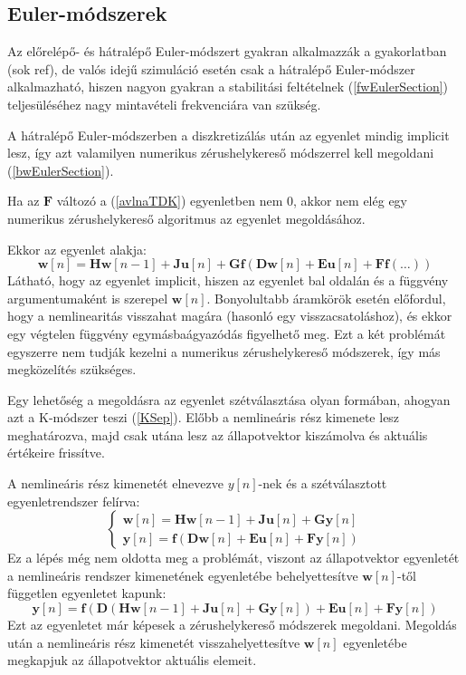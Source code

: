 \subsection{Euler-módszerek}

Az előrelépő- és hátralépő Euler-módszert gyakran alkalmazzák a gyakorlatban (sok ref), de valós idejű szimuláció esetén csak a hátralépő Euler-módszer alkalmazható, hiszen nagyon gyakran a stabilitási feltételnek (\ref{fwEulerSection}) teljesüléséhez nagy mintavételi frekvenciára van szükség.

A hátralépő Euler-módszerben a diszkretizálás után az egyenlet mindig implicit lesz, így azt valamilyen numerikus zérushelykereső módszerrel kell megoldani (\ref{bwEulerSection}). 

Ha az $\mathbf{F}$ változó a (\ref{avlnaTDK}) egyenletben nem $0$, akkor nem elég egy numerikus zérushelykereső algoritmus az egyenlet megoldásához.

Ekkor az egyenlet alakja:
\begin{equation}
    \mathbf{w}[n]=\mathbf{Hw}[n-1]+\mathbf{Ju}[n]+\mathbf{Gf}(\mathbf{Dw}[n]+\mathbf{Eu}[n]+\mathbf{Ff}(\ldots))
\end{equation}
Látható, hogy az egyenlet implicit, hiszen az egyenlet bal oldalán és a függvény argumentumaként is szerepel $\mathbf{w}[n]$. Bonyolultabb áramkörök esetén előfordul, hogy a nemlinearitás visszahat magára (hasonló egy visszacsatoláshoz), és ekkor egy végtelen függvény egymásbaágyazódás figyelhető meg. Ezt a két problémát egyszerre nem tudják kezelni a numerikus zérushelykereső módszerek, így más megközelítés szükséges.

Egy lehetőség a megoldásra az egyenlet szétválasztása olyan formában, ahogyan azt a K-módszer teszi (\ref{KSep}). Előbb a nemlineáris rész kimenete lesz meghatározva, majd csak utána lesz az állapotvektor kiszámolva és aktuális értékeire frissítve.

A nemlineáris rész kimenetét elnevezve $y[n]$-nek és a szétválasztott egyenletrendszer felírva:
\begin{equation}
    \begin{cases}
        \mathbf{w}[n]=\mathbf{Hw}[n-1]+\mathbf{Ju}[n]+\mathbf{Gy}[n]\\
        \mathbf{y}[n]=\mathbf{f}(\mathbf{Dw}[n]+\mathbf{Eu}[n]+\mathbf{Fy}[n])
    \end{cases}
\end{equation}
Ez a lépés még nem oldotta meg a problémát, viszont az állapotvektor egyenletét a nemlineáris rendszer kimenetének egyenletébe behelyettesítve $\mathbf{w}[n]$-től független egyenletet kapunk:
\begin{equation}
    \mathbf{y}[n]=\mathbf{f}(\mathbf{D}(\mathbf{Hw}[n-1]+\mathbf{Ju}[n]+\mathbf{Gy}[n])+\mathbf{Eu}[n]+\mathbf{Fy}[n])
\end{equation}
Ezt az egyenletet már képesek a zérushelykereső módszerek megoldani. Megoldás után a nemlineáris rész kimenetét visszahelyettesítve $\mathbf{w}[n]$ egyenletébe megkapjuk az állapotvektor aktuális elemeit.

